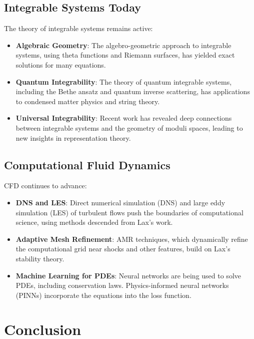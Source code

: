 \subsection{Integrable Systems Today}

The theory of integrable systems remains active:

\begin{itemize}
\item \textbf{Algebraic Geometry}: The algebro-geometric approach to integrable systems, using theta functions and Riemann surfaces, has yielded exact solutions for many equations.

\item \textbf{Quantum Integrability}: The theory of quantum integrable systems, including the Bethe ansatz and quantum inverse scattering, has applications to condensed matter physics and string theory.

\item \textbf{Universal Integrability}: Recent work has revealed deep connections between integrable systems and the geometry of moduli spaces, leading to new insights in representation theory.
\end{itemize}

\subsection{Computational Fluid Dynamics}

CFD continues to advance:

\begin{itemize}
\item \textbf{DNS and LES}: Direct numerical simulation (DNS) and large eddy simulation (LES) of turbulent flows push the boundaries of computational science, using methods descended from Lax's work.

\item \textbf{Adaptive Mesh Refinement}: AMR techniques, which dynamically refine the computational grid near shocks and other features, build on Lax's stability theory.

\item \textbf{Machine Learning for PDEs}: Neural networks are being used to solve PDEs, including conservation laws. Physics-informed neural networks (PINNs) incorporate the equations into the loss function.
\end{itemize}

\section{Conclusion}

